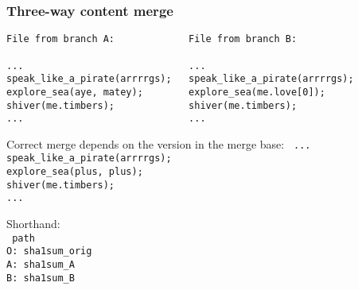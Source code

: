 \documentclass[t]{beamer}
\begin{document}
\begin{frame}[containsverbatim]
  \frametitle{Three-way content merge}

  {\footnotesize
  \begin{verbatim}
File from branch A:             File from branch B:

...                             ...                             
speak_like_a_pirate(arrrrgs);   speak_like_a_pirate(arrrrgs);   
explore_sea(aye, matey);        explore_sea(me.love[0]);
shiver(me.timbers);             shiver(me.timbers);             
...                             ...
  \end{verbatim}
  }

  \vspace*{-1.2em}
  Correct merge depends on the version in the merge base:
  {\footnotesize
  \texttt{
...\\
speak\_like\_a\_pirate(arrrrgs);\\
{\color{red}explore\_sea(plus, plus);}\\
shiver(me.timbers);\\
...
  }}

  \vspace*{1em}
  Shorthand:\\
  {\footnotesize
  \texttt{
  \hspace*{0.7em} path\\
  O: sha1sum\_orig\\
  A: sha1sum\_A\\
  B: sha1sum\_B
  }}
  
\end{frame}

\end{document}
